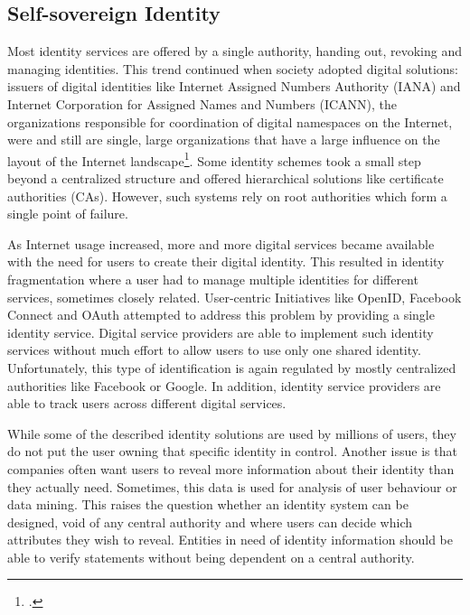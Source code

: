 \documentclass[USenglish]{article}
\begin{document}
\subsection{Self-sovereign Identity}

Most identity services are offered by a single authority, handing out, revoking and managing identities.
This trend continued when society adopted digital solutions: issuers of digital identities like Internet Assigned Numbers Authority (IANA) and Internet Corporation for Assigned Names and Numbers (ICANN), the organizations responsible for coordination of digital namespaces on the Internet, were and still are single, large organizations that have a large influence on the layout of the Internet landscape\footcite{pathtossi}.
Some identity schemes took a small step beyond a centralized structure and offered hierarchical solutions like certificate authorities (CAs).
However, such systems rely on root authorities which form a single point of failure.

As Internet usage increased, more and more digital services became available with the need for users to create their digital identity.
This resulted in identity fragmentation where a user had to manage multiple identities for different services, sometimes closely related.
User-centric Initiatives like OpenID, Facebook Connect and OAuth attempted to address this problem by providing a single identity service.
Digital service providers are able to implement such identity services without much effort to allow users to use only one shared identity.
Unfortunately, this type of identification is again regulated by mostly centralized authorities like Facebook or Google.
In addition, identity service providers are able to track users across different digital services.

While some of the described identity solutions are used by millions of users, they do not put the user owning that specific identity in control.
Another issue is that companies often want users to reveal more information about their identity than they actually need.
Sometimes, this data is used for analysis of user behaviour or data mining.
This raises the question whether an identity system can be designed, void of any central authority and where users can decide which attributes they wish to reveal.
Entities in need of identity information should be able to verify statements without being dependent on a central authority.
\end{document}

